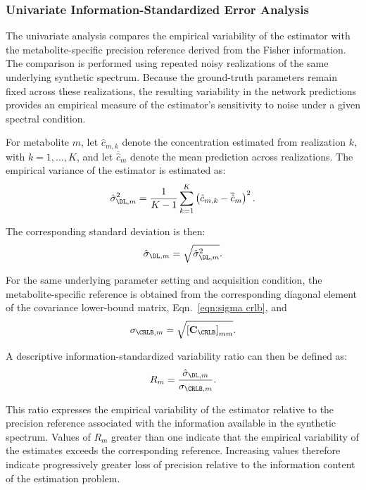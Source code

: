\subsubsection{Univariate Information-Standardized Error Analysis}
\label{sec:Analy&Visual:subsec:infoStand:subsubsec:}
The univariate analysis compares the empirical variability of the \DL estimator with the metabolite-specific precision reference derived from the Fisher information. The comparison is performed using repeated noisy realizations of the same underlying synthetic spectrum. Because the ground-truth parameters remain fixed across these realizations, the resulting variability in the network predictions provides an empirical measure of the estimator's sensitivity to noise under a given spectral condition.

For metabolite $m$, let $\hat{c}_{m,k}$ denote the concentration estimated from realization $k$, with $k=1,\ldots,K$, and let $\overline{\hat{c}}_m$ denote the mean prediction across realizations. The empirical variance of the \DL estimator is estimated as:
\begin{equation}
    \hat{\sigma}_{\DL,m}^{2} = \frac{1}{K-1}\sum_{k=1}^{K}\left(\hat{c}_{m,k} - \overline{\hat{c}}_m \right)^{2}.
\end{equation}

The corresponding standard deviation is then:
\begin{equation}
    \hat{\sigma}_{\DL,m} = \sqrt{\hat{\sigma}_{\DL,m}^{2}}.
\end{equation}

For the same underlying parameter setting and acquisition condition, the metabolite-specific \CRLB reference is obtained from the corresponding diagonal element of the covariance lower-bound matrix, Eqn.~\ref{eqn:sigma crlb}, and
\begin{equation}
    \sigma_{\CRLB,m} = \sqrt{\left[\mathbf{C}_{\CRLB}\right]_{mm}}.
\end{equation}

A descriptive information-standardized variability ratio can then be defined as:
\begin{equation}
    R_m = \frac{\hat{\sigma}_{\DL,m}}{\sigma_{\CRLB,m}}.
\end{equation}

This ratio expresses the empirical variability of the \DL estimator relative to the precision reference associated with the information available in the synthetic spectrum. Values of $R_m$ greater than one indicate that the empirical variability of the \DL estimates exceeds the corresponding \CRLB reference. Increasing values therefore indicate progressively greater loss of precision relative to the information content of the estimation problem.

